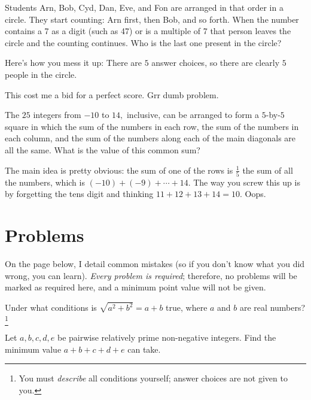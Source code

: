\documentclass[mast]{lucky}
\begin{document}
\begin{exam}[AMC 8 2018/3]
Students Arn, Bob, Cyd, Dan, Eve, and Fon are arranged in that order in a circle. They start counting: Arn first, then Bob, and so forth. When the number contains a 7 as a digit (such as 47) or is a multiple of 7 that person leaves the circle and the counting continues. Who is the last one present in the circle?
\end{exam}

Here's how you mess it up: There are $5$ answer choices, so there are clearly $5$ people in the circle.

This cost me a bid for a perfect score. Grr dumb problem.

\begin{exam}[AMC 10A 2020/7]
The $25$ integers from $-10$ to $14,$ inclusive, can be arranged to form a $5$-by-$5$ square in which the sum of the numbers in each row, the sum of the numbers in each column, and the sum of the numbers along each of the main diagonals are all the same. What is the value of this common sum?
\end{exam}

The main idea is pretty obvious: the sum of one of the rows is $\frac{1}{5}$ the sum of all the numbers, which is $(-10)+(-9)+\cdots+14.$ The way you screw this up is by forgetting the tens digit and thinking $11+12+13+14=10.$ Oops.

\pagebreak

\section{Problems}

On the page below, I detail common mistakes (so if you don't know what you did wrong, you can learn). \emph{Every problem is required}; therefore, no problems will be marked as required here, and a minimum point value will not be given.


\begin{prob}[AMC 12A 2021/2]{2}
Under what conditions is $\sqrt{a^2+b^2}=a+b$ true, where $a$ and $b$ are real numbers?\footnote{You must \textit{describe} all conditions yourself; answer choices are not given to you.}
\end{prob}

\begin{prob}{2}
Let $a,b,c,d,e$ be pairwise relatively prime non-negative integers. Find the minimum value $a+b+c+d+e$ can take.
\end{prob}
\end{document}
